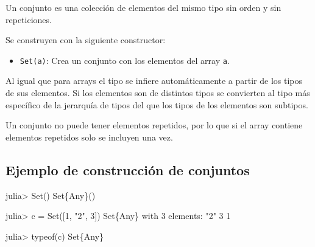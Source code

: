 \documentclass[
  letterpaper,
  DIV=11,
  numbers=noendperiod]{scrreprt}
\newenvironment{Shaded}{\begin{snugshade}}{\end{snugshade}}
\newcommand{\DataTypeTok}[1]{\textcolor[rgb]{0.68,0.00,0.00}{#1}}
\newcommand{\FloatTok}[1]{\textcolor[rgb]{0.68,0.00,0.00}{#1}}
\newcommand{\FunctionTok}[1]{\textcolor[rgb]{0.28,0.35,0.67}{#1}}
\newcommand{\NormalTok}[1]{\textcolor[rgb]{0.00,0.23,0.31}{#1}}
\newcommand{\OperatorTok}[1]{\textcolor[rgb]{0.37,0.37,0.37}{#1}}
\newcommand{\StringTok}[1]{\textcolor[rgb]{0.13,0.47,0.30}{#1}}
\providecommand{\tightlist}{%
  \setlength{\itemsep}{0pt}\setlength{\parskip}{0pt}}\usepackage{longtable,booktabs,array}
\begin{document}
Un conjunto es una colección de elementos del mismo tipo sin orden y sin
repeticiones.

Se construyen con la siguiente constructor:

\begin{itemize}
\tightlist
\item
  \texttt{Set(a)}: Crea un conjunto con los elementos del array
  \texttt{a}.
\end{itemize}

Al igual que para arrays el tipo se infiere automáticamente a partir de
los tipos de sus elementos. Si los elementos son de distintos tipos se
convierten al tipo más específico de la jerarquía de tipos del que los
tipos de los elementos son subtipos.

\begin{tcolorbox}[enhanced jigsaw, colbacktitle=quarto-callout-warning-color!10!white, coltitle=black, opacityback=0, opacitybacktitle=0.6, bottomtitle=1mm, leftrule=.75mm, toprule=.15mm, bottomrule=.15mm, toptitle=1mm, breakable, colframe=quarto-callout-warning-color-frame, colback=white, rightrule=.15mm, titlerule=0mm, title=\textcolor{quarto-callout-warning-color}{\faExclamationTriangle}\hspace{0.5em}{Warning}, arc=.35mm, left=2mm]
Un conjunto no puede tener elementos repetidos, por lo que si el array
contiene elementos repetidos solo se incluyen una vez.
\end{tcolorbox}

\hypertarget{ejemplo-de-construcciuxf3n-de-conjuntos}{%
\subsection{Ejemplo de construcción de
conjuntos}\label{ejemplo-de-construcciuxf3n-de-conjuntos}}

\begin{Shaded}
\begin{Highlighting}[]
\NormalTok{julia}\OperatorTok{\textgreater{}} \FunctionTok{Set}\NormalTok{()}
\FunctionTok{Set}\DataTypeTok{\{Any\}}\NormalTok{()}

\NormalTok{julia}\OperatorTok{\textgreater{}}\NormalTok{ c }\OperatorTok{=} \FunctionTok{Set}\NormalTok{([}\FloatTok{1}\NormalTok{, }\StringTok{"2"}\NormalTok{, }\FloatTok{3}\NormalTok{])}
\DataTypeTok{Set}\NormalTok{\{}\DataTypeTok{Any}\NormalTok{\} with }\FloatTok{3}\NormalTok{ elements}\OperatorTok{:}
  \StringTok{"2"}
  \FloatTok{3}
  \FloatTok{1}

\NormalTok{julia}\OperatorTok{\textgreater{}} \FunctionTok{typeof}\NormalTok{(c)}
\DataTypeTok{Set}\NormalTok{\{}\DataTypeTok{Any}\NormalTok{\}}
\end{Highlighting}
\end{Shaded}
\end{document}
